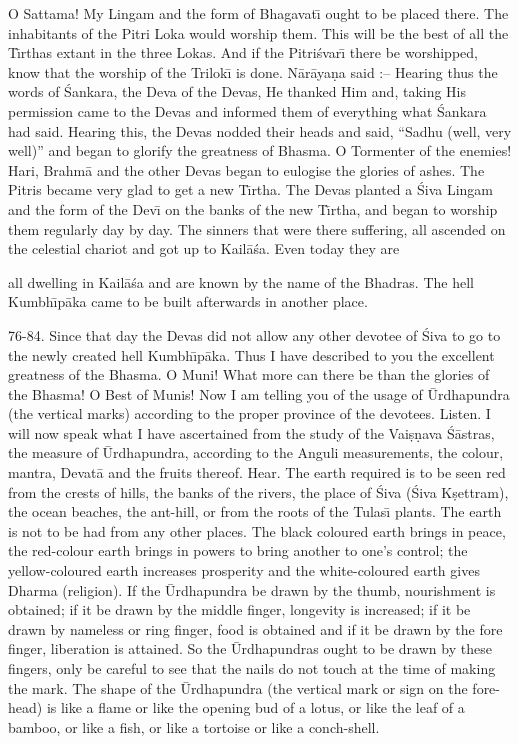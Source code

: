O Sattama! My Lingam and the form of Bhagavat\={\i} ought to be placed there. The inhabitants of the Pitri Loka would worship them. This will be the best of all the T\={\i}rthas extant in the three Lokas. And if the Pitri\'svar\={\i} there be worshipped, know that the worship of the Trilok\={\i} is done. N\=ar\=aya\d{n}a said :-- Hearing thus the words of \'Sankara, the Deva of the Devas, He thanked Him and, taking His permission came to the Devas and informed them of everything what \'Sankara had said. Hearing this, the Devas nodded their heads and said, ``Sadhu (well, very well)'' and began to glorify the greatness of Bhasma. O Tormenter of the enemies! Hari, Brahm\=a and the other Devas began to eulogise the glories of ashes. The Pitris became very glad to get a new T\={\i}rtha. The Devas planted a \'Siva Lingam and the form of the Dev\={\i} on the banks of the new T\={\i}rtha, and began to worship them regularly day by day. The sinners that were there suffering, all ascended on the celestial chariot and got up to Kail\=a\'sa. Even today they are

all dwelling in Kail\=a\'sa and are known by the name of the Bhadras. The hell Kumbh\={\i}p\=aka came to be built afterwards in another place.

76-84. Since that day the Devas did not allow any other devotee of \'Siva to go to the newly created hell Kumbh\={\i}p\=aka. Thus I have described to you the excellent greatness of the Bhasma. O Muni! What more can there be than the glories of the Bhasma! O Best of Munis! Now I am telling you of the usage of \=Urdhapundra (the vertical marks) according to the proper province of the devotees. Listen. I will now speak what I have ascertained from the study of the Vai\d{s}\d{n}ava \'S\=astras, the measure of \=Urdhapundra, according to the Anguli measurements, the colour, mantra, Devat\=a and the fruits thereof. Hear. The earth required is to be seen red from the crests of hills, the banks of the rivers, the place of \'Siva (\'Siva K\d{s}ettram), the ocean beaches, the ant-hill, or from the roots of the Tulas\={\i} plants. The earth is not to be had from any other places. The black coloured earth brings in peace, the red-colour earth brings in powers to bring another to one's control; the yellow-coloured earth increases prosperity and the white-coloured earth gives Dharma (religion). If the \=Urdhapundra be drawn by the thumb, nourishment is obtained; if it be drawn by the middle finger, longevity is increased; if it be drawn by nameless or ring finger, food is obtained and if it be drawn by the fore finger, liberation is attained. So the \=Urdhapundras ought to be drawn by these fingers, only be careful to see that the nails do not touch at the time of making the mark. The shape of the \=Urdhapundra (the vertical mark or sign on the fore-head) is like a flame or like the opening bud of a lotus, or like the leaf of a bamboo, or like a fish, or like a tortoise or like a conch-shell.

